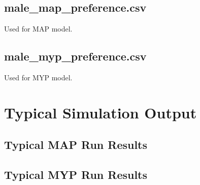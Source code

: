 \documentclass[authoryearcitations]{UoYCSproject}
\begin{document}
\section{male\_map\_preference.csv}
Used for MAP model.

\section{male\_myp\_preference.csv}
Used for MYP model.

\chapter{Typical Simulation Output}
\label{adx:typicalSimulationOutput}
\section{Typical MAP Run Results}


\section{Typical MYP Run Results}
\end{document}
